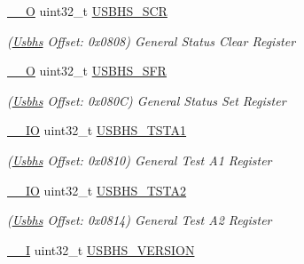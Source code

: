 \begin{DoxyCompactItemize}
\mbox{\hyperlink{core__cm7_8h_a7e25d9380f9ef903923964322e71f2f6}{\+\_\+\+\_\+O}} uint32\+\_\+t \mbox{\hyperlink{structUsbhs_a6e14557f921b5fb2c6a27e7aba536065}{U\+S\+B\+H\+S\+\_\+\+S\+CR}}
\begin{DoxyCompactList}\small\item\em (\mbox{\hyperlink{structUsbhs}{Usbhs}} Offset\+: 0x0808) General Status Clear Register \end{DoxyCompactList}\item 
\mbox{\label{structUsbhs_aa6bec460dac1aa8252e89b597938405b}} 
\mbox{\hyperlink{core__cm7_8h_a7e25d9380f9ef903923964322e71f2f6}{\+\_\+\+\_\+O}} uint32\+\_\+t \mbox{\hyperlink{structUsbhs_aa6bec460dac1aa8252e89b597938405b}{U\+S\+B\+H\+S\+\_\+\+S\+FR}}
\begin{DoxyCompactList}\small\item\em (\mbox{\hyperlink{structUsbhs}{Usbhs}} Offset\+: 0x080C) General Status Set Register \end{DoxyCompactList}\item 
\mbox{\label{structUsbhs_a9a9375a871daba27d67442b7c3fa461f}} 
\mbox{\hyperlink{core__cm7_8h_aec43007d9998a0a0e01faede4133d6be}{\+\_\+\+\_\+\+IO}} uint32\+\_\+t \mbox{\hyperlink{structUsbhs_a9a9375a871daba27d67442b7c3fa461f}{U\+S\+B\+H\+S\+\_\+\+T\+S\+T\+A1}}
\begin{DoxyCompactList}\small\item\em (\mbox{\hyperlink{structUsbhs}{Usbhs}} Offset\+: 0x0810) General Test A1 Register \end{DoxyCompactList}\item 
\mbox{\label{structUsbhs_a78d78f0378398dc8acf7084429a1af68}} 
\mbox{\hyperlink{core__cm7_8h_aec43007d9998a0a0e01faede4133d6be}{\+\_\+\+\_\+\+IO}} uint32\+\_\+t \mbox{\hyperlink{structUsbhs_a78d78f0378398dc8acf7084429a1af68}{U\+S\+B\+H\+S\+\_\+\+T\+S\+T\+A2}}
\begin{DoxyCompactList}\small\item\em (\mbox{\hyperlink{structUsbhs}{Usbhs}} Offset\+: 0x0814) General Test A2 Register \end{DoxyCompactList}\item 
\mbox{\label{structUsbhs_afd348be807d359091200e7bd52f22aaa}} 
\mbox{\hyperlink{core__cm7_8h_af63697ed9952cc71e1225efe205f6cd3}{\+\_\+\+\_\+I}} uint32\+\_\+t \mbox{\hyperlink{structUsbhs_afd348be807d359091200e7bd52f22aaa}{U\+S\+B\+H\+S\+\_\+\+V\+E\+R\+S\+I\+ON}}

\end{DoxyCompactItemize}
